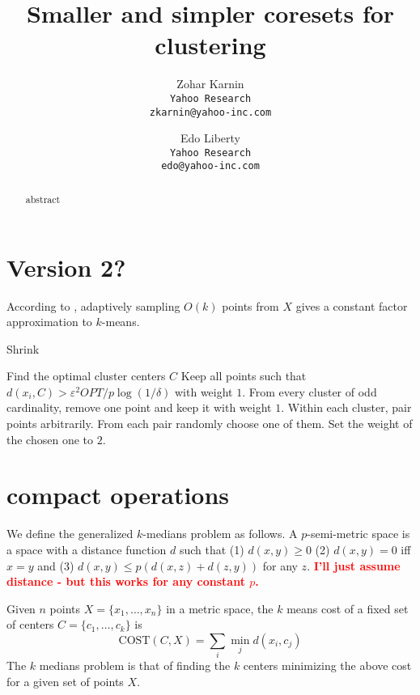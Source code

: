 \documentclass[11pt]{article}
\title{Smaller and simpler coresets for clustering}
\author{
Zohar Karnin\\ \texttt{Yahoo Research}\\ \texttt{\small zkarnin@yahoo-inc.com}
\and
Edo Liberty\\ \texttt{Yahoo Research}\\ \texttt{\small edo@yahoo-inc.com}
}
\date\nonumber
\newcommand{\eps}{\varepsilon}
\newcommand{\note}[1]{\textbf{\textcolor{red}{#1}}}
\newcommand{\cost}{\text{COST}}
\begin{document}
\maketitle

\begin{abstract}
abstract\end{abstract}
\section{Version 2?}
According to \cite{AggarwalDK09}, adaptively sampling $O(k)$ points from $X$ gives a constant factor approximation to $k$-means.
\begin{algorithm} 
\begin{algorithmic}
\caption{Shrink} \label{alg:shrink}
\State Find the optimal cluster centers $C$
\State Keep all points such that $d(x_i, C) > \eps^2 OPT /p\log(1/\delta)$ with weight $1$.
\State From every cluster of odd cardinality, remove one point and keep it with weight $1$.
\State Within each cluster, pair points arbitrarily. From each pair randomly choose one of them. Set the weight of the chosen one to $2$.
\end{algorithmic}
\end{algorithm}




\section{compact operations}
We define the generalized $k$-medians problem as follows. A $p$-semi-metric space is a space with a distance function $d$ such that (1) $d(x,y) \geq 0$ (2) $d(x,y)=0$ iff $x=y$ and (3) $d(x,y) \leq p(d(x,z) + d(z,y))$ for any $z$. \note{I'll just assume distance - but this works for any constant $p$.}

Given $n$ points $X = \{x_1,\ldots,x_n\}$ in a metric space, the $k$ means cost of a fixed set of centers $C = \{c_1,\ldots,c_k\}$ is 
$$ \text{COST}(C,X) = \sum_i \min_j d(x_i,c_j)$$
The $k$ medians problem is that of finding the $k$ centers minimizing the above cost for a given set of points $X$. 


\end{document}
